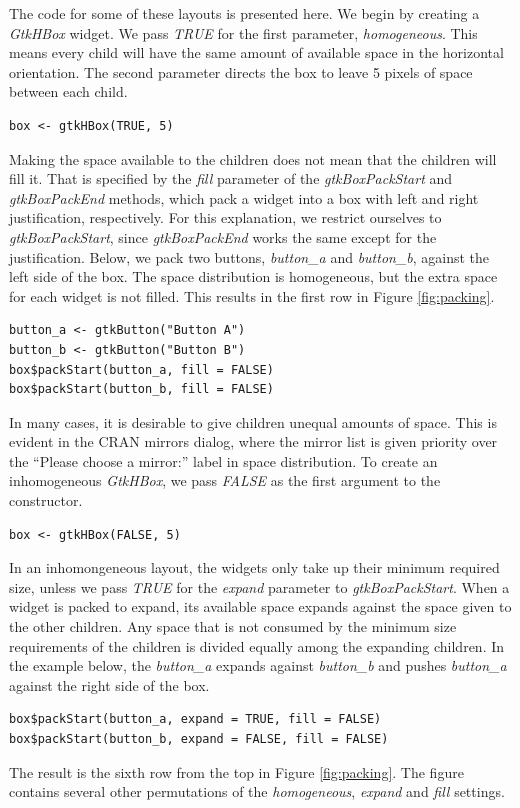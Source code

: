 \documentclass[article]{jss}
\begin{document}
The code for some of these layouts is presented here.
We begin by creating a \emph{GtkHBox} widget. We pass \emph{TRUE} for the
first parameter, \emph{homogeneous}. This means every child will have the
same amount of available space in the horizontal orientation. The second 
parameter directs the box to leave 5 pixels of space between each child. 
\begin{verbatim}
box <- gtkHBox(TRUE, 5)
\end{verbatim}
Making the space available to the children does not mean that the children 
will fill it. That is specified by the \emph{fill} parameter of the 
\emph{gtkBoxPackStart} and \emph{gtkBoxPackEnd} methods, which pack a widget 
into a box with left and right justification, respectively. For this explanation,
we restrict ourselves to \emph{gtkBoxPackStart}, since \emph{gtkBoxPackEnd}
works the same except for the justification. Below, we pack two buttons, 
\emph{button\_a} and \emph{button\_b}, against
the left side of the box. The space distribution is homogeneous, but the
extra space for each widget is not filled. This results in the first row in 
Figure \ref{fig:packing}.
\begin{verbatim}
button_a <- gtkButton("Button A")
button_b <- gtkButton("Button B")
box$packStart(button_a, fill = FALSE)
box$packStart(button_b, fill = FALSE)
\end{verbatim}

In many cases, it is desirable to give children unequal amounts of space.
This is evident in the CRAN mirrors dialog, where the mirror list is given
priority over the ``Please choose a mirror:'' label in space distribution.
To create an inhomogeneous \emph{GtkHBox}, we pass \emph{FALSE} as the first
argument to the constructor.
\begin{verbatim}
box <- gtkHBox(FALSE, 5)
\end{verbatim}
In an inhomongeneous layout, the widgets only take up their minimum required
size, unless we pass \emph{TRUE} for the \emph{expand} parameter to
\emph{gtkBoxPackStart}. When a widget is packed to expand, its available space
expands against the space given to the other children. Any space that is
not consumed by the minimum size requirements of the children is divided
equally among the expanding children. In the example below, the \emph{button\_a}
expands against \emph{button\_b} and pushes \emph{button\_a} against the right 
side of the box.
\begin{verbatim}
box$packStart(button_a, expand = TRUE, fill = FALSE)
box$packStart(button_b, expand = FALSE, fill = FALSE)
\end{verbatim}
The result is the sixth row from the top in Figure \ref{fig:packing}. The
figure contains several other permutations of the \emph{homogeneous}, \emph{expand} 
and \emph{fill} settings.
\end{document}
